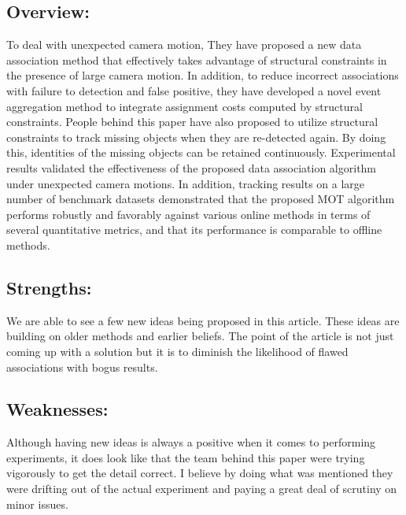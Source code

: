 \documentclass{article}
\begin{document}
\subsection*{Overview:} 

\begin{adjustwidth}{1cm}{}
To deal with unexpected camera motion, They have proposed a new data association method that effectively takes advantage of structural constraints in the presence of large camera motion. In addition, to reduce incorrect associations with failure to detection and false positive, they have developed a novel event aggregation method to integrate assignment costs computed by structural constraints. People behind this paper have also proposed to utilize structural constraints to track missing objects when they are re-detected again. By doing this, identities of the missing objects can be retained continuously. Experimental results validated the effectiveness of the proposed data association algorithm under unexpected camera motions. In addition, tracking results on a large number of benchmark datasets demonstrated that the proposed MOT algorithm performs robustly and favorably against various online methods in terms of several quantitative metrics, and that its performance is comparable to offline methods.
\end{adjustwidth}

\subsection*{Strengths:} 

\begin{adjustwidth}{1cm}{}
	We are able to see a few new ideas being proposed in this article. These ideas are building on older methods and earlier beliefs. The point of the article is not just coming up with a solution but it is to diminish the likelihood of flawed associations with bogus results. 
\end{adjustwidth}

\subsection*{Weaknesses:} 

\begin{adjustwidth}{1cm}{}
	Although having new ideas is always a positive when it comes to performing experiments, it does look like that the team behind this paper were trying vigorously to get the detail correct. I believe by doing what was mentioned they were drifting out of the actual experiment and paying a great deal of scrutiny on minor issues.  
\end{adjustwidth}
\end{document}
